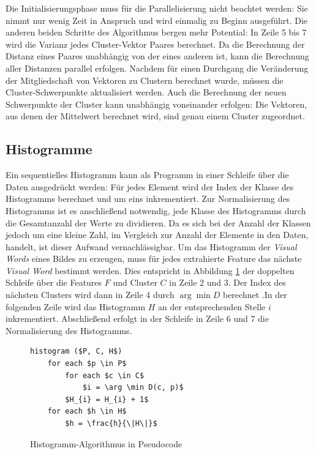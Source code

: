 Die Initialisierungsphase muss für die Parallelisierung nicht beachtet werden: Sie nimmt nur wenig Zeit in Anspruch und wird einmalig zu Beginn ausgeführt. Die anderen beiden Schritte des Algorithmus bergen mehr Potential: In Zeile 5 bis 7 wird die Varianz jedes Cluster-Vektor Paares berechnet. Da die Berechnung der Distanz eines Paares unabhängig von der eines anderen ist, kann die Berechnung aller Distanzen parallel erfolgen. Nachdem für einen Durchgang die Veränderung der Mitgliedschaft von Vektoren zu Clustern berechnet wurde, müssen die Cluster-Schwerpunkte aktualisiert werden. Auch die Berechnung der neuen Schwerpunkte der Cluster kann unabhängig voneinander erfolgen: Die Vektoren, aus denen der Mittelwert berechnet wird, sind genau einem Cluster zugeordnet.

\subsection{Histogramme}

Ein sequentielles Histogramm kann als Programm in einer Schleife über die Daten ausgedrückt werden: Für jedes Element wird der Index der Klasse des Histogramms berechnet und um eins inkrementiert. Zur Normalisierung des Histogramms ist es anschließend notwendig, jede Klasse des Histogramms durch die Gesamtanzahl der Werte zu dividieren. Da es sich bei der Anzahl der Klassen jedoch um eine kleine Zahl, im Vergleich zur Anzahl der Elemente in den Daten, handelt, ist dieser Aufwand vernachlässigbar.
Um das Histogramm der \textit{Visual Words} eines Bildes zu erzeugen, muss für jedes extrahierte Feature das nächste \textit{Visual Word} bestimmt werden. Dies entspricht in Abbildung \ref{code:histo} der doppelten Schleife über die Features $F$ und Cluster $C$ in Zeile 2 und 3. Der Index des nächsten Clusters wird dann in Zeile 4 durch $\arg \min D$ berechnet .In der folgenden Zeile wird das Histogramm $H$ an der entsprechenden Stelle $i$ inkrementiert. Abschließend erfolgt in der Schleife in Zeile 6 und 7 die Normalisierung des Histogramms.

\begin{figure}
\begin{lstlisting}[mathescape=true, style=Math]
histogram ($P, C, H$)
	for each $p \in P$
		for each $c \in C$
			$i = \arg \min D(c, p)$ 
		$H_{i} = H_{i} + 1$		
	for each $h \in H$
		$h = \frac{h}{\|H\|}$
\end{lstlisting}
\caption{Histogramm-Algorithmus in Pseudocode}
\label{code:histo}
\end{figure}

